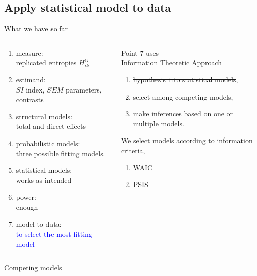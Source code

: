 \subsection{Apply statistical model to data}
%
%
\begin{frame}[t, negative]
	\subsectionpage
\end{frame}
%
%
\begin{frame}
	{What we have so far}
	\begin{columns}
		\begin{column}{0.5\textwidth}
			\begin{enumerate}
				\item measure: \\
				replicated entropies $H^{O}_{ik}$
				\item estimand: \\
				$SI$ index, $SEM$ parameters, contrasts
				\item structural models: \\
				total and direct effects
				\item probabilistic models: \\
				three possible fitting models
				\item statistical models: \\
				works as intended
				\item power: \\
				enough
				\item model to data: \\
				\textcolor{blue}{to select the most fitting model}
			\end{enumerate}
		\end{column}
		\begin{column}{0.5\textwidth}  
			Point $7$ uses \\
			Information Theoretic Approach \cite{Anderson_2008, Chamberlain_1965}
			\begin{enumerate}
				\item \sout{hypothesis into statistical models},
				\item select among competing models, 
				\item make inferences based on one or multiple models.
			\end{enumerate}
			
			We select models according to information criteria,
			\begin{enumerate}
				\item WAIC \cite{Watanabe_2013}
				\item PSIS \cite{Vehtari_et_al_2021}
			\end{enumerate}
		\end{column}
	\end{columns}
\end{frame}
%
%
\begin{lhframe}[rhgraphic={\texttt{[image: ES\_ROPE.png]}}]
	{Competing models}
	
\end{lhframe}
%
%
